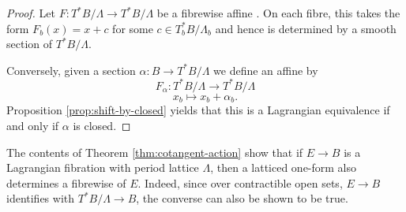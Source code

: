 \begin{proof}
    Let $F: T^*B/\Lambda \to T^*B/\Lambda$ be a fibrewise affine . On each fibre, this takes the form $F_b(x) = x+c$ for some
    $c \in T^*_bB/\Lambda_b$ and hence is determined by a smooth section of $T^*B/\Lambda$.

    Conversely, given a section $\alpha: B \to T^*B/\Lambda$ we define an affine by
    $$ F_{\alpha} : T^*B/\Lambda \to T^*B/\Lambda $$ $$ x_b \mapsto x_b + \alpha_b.
    $$ Proposition \ref{prop:shift-by-closed} yields that this is a Lagrangian
    equivalence if and only if $\alpha$ is closed.
\end{proof}
\begin{remark}
    The contents of Theorem \ref{thm:cotangent-action} show that if $E \to B$ is a Lagrangian fibration with period lattice $\Lambda$, then a latticed one-form also
    determines a fibrewise  of $E$. Indeed, since over contractible open sets, $E \to B$ identifies with $T^*B/\Lambda \to B$, the converse can also be shown to be true.
\end{remark}

